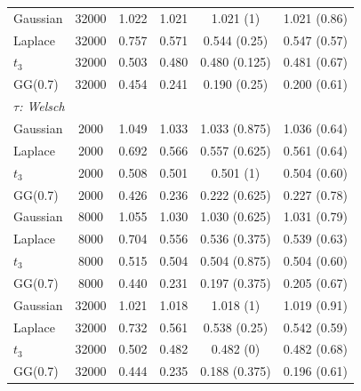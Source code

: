 \begin{tabular}{lccccc}
Gaussian & 32000 & 1.022 & 1.021 & 1.021 (1) & 1.021 (0.86) \\
Laplace & 32000 & 0.757 & 0.571 & 0.544 (0.25) & 0.547 (0.57) \\
$t_3$ & 32000 & 0.503 & 0.480 & 0.480 (0.125) & 0.481 (0.67) \\
GG(0.7) & 32000 & 0.454 & 0.241 & 0.190 (0.25) & 0.200 (0.61) \\
\multicolumn{6}{l}{\emph{$\tau$: Welsch}} \\
Gaussian & 2000 & 1.049 & 1.033 & 1.033 (0.875) & 1.036 (0.64) \\
Laplace & 2000 & 0.692 & 0.566 & 0.557 (0.625) & 0.561 (0.64) \\
$t_3$ & 2000 & 0.508 & 0.501 & 0.501 (1) & 0.504 (0.60) \\
GG(0.7) & 2000 & 0.426 & 0.236 & 0.222 (0.625) & 0.227 (0.78) \\
Gaussian & 8000 & 1.055 & 1.030 & 1.030 (0.625) & 1.031 (0.79) \\
Laplace & 8000 & 0.704 & 0.556 & 0.536 (0.375) & 0.539 (0.63) \\
$t_3$ & 8000 & 0.515 & 0.504 & 0.504 (0.875) & 0.504 (0.60) \\
GG(0.7) & 8000 & 0.440 & 0.231 & 0.197 (0.375) & 0.205 (0.67) \\
Gaussian & 32000 & 1.021 & 1.018 & 1.018 (1) & 1.019 (0.91) \\
Laplace & 32000 & 0.732 & 0.561 & 0.538 (0.25) & 0.542 (0.59) \\
$t_3$ & 32000 & 0.502 & 0.482 & 0.482 (0) & 0.482 (0.68) \\
GG(0.7) & 32000 & 0.444 & 0.235 & 0.188 (0.375) & 0.196 (0.61) \\
\bottomrule
\end{tabular}
